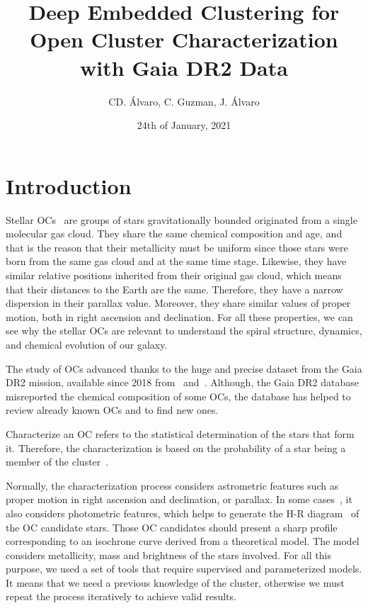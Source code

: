\documentclass[11pt,a4paper,english,twocolumn]{article}
\title{Deep Embedded Clustering for Open Cluster Characterization with Gaia DR2 Data}
\author{CD. Álvaro, C. Guzman, J. Álvaro}
\date{24th of January, 2021}
\begin{document}
\twocolumn[
\begin{@twocolumnfalse}
\maketitle
\end{@twocolumnfalse}
]




\section{Introduction}

Stellar OCs~\cite{janes1982open} are groups of stars gravitationally
bounded originated from a single molecular gas cloud.
They share the same chemical composition and age, and that is the reason
that their metallicity must be uniform since those stars were born from
the same gas cloud and at the same time stage. Likewise, they have similar
relative positions inherited from their original gas cloud, which means that
their distances to the Earth are the same. Therefore, they have a narrow
dispersion in their parallax value. Moreover, they share similar values
of proper motion, both in right ascension and declination. For all these
properties, we can see why the stellar OCs are relevant to understand the
spiral structure, dynamics, and chemical evolution of our galaxy.

The study of OCs advanced thanks to the huge and precise dataset
from the Gaia DR2 mission, available since 2018 from~\cite{collaboration2016description}
and~\cite{gaia2018gaia}. Although, the Gaia DR2 database misreported the chemical
composition of some OCs, the database has helped to review already known OCs and
to find new ones.

Characterize an OC refers to the statistical determination of the stars that
form it. Therefore, the characterization is based on the probability of a star
being a member of the cluster~\cite{sampedro2016caracterizacion}.

Normally, the characterization process considers astrometric features such as
proper motion in right ascension and declination, or parallax.
In some cases~\cite{oliveira2013fitting}, it also considers photometric features,
which helps to generate the H-R diagram~\cite{hypki2018gaia} of the OC candidate stars.
Those OC candidates should present a sharp profile corresponding to an isochrone curve
derived from a theoretical model. The model considers metallicity, mass and brightness
of the stars involved. For all this purpose, we used a set of tools that require
supervised and parameterized models. It means that we need a previous knowledge of the
cluster, otherwise we must repeat the process iteratively to achieve valid results.
\end{document}
